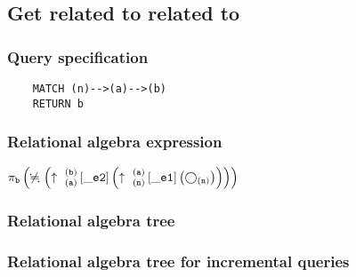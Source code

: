 	\subsection{Get related to related to}

	\subsubsection*{Query specification}

	\begin{lstlisting}
	MATCH (n)-->(a)-->(b)
	RETURN b
	\end{lstlisting}


	\subsubsection*{Relational algebra expression}

	$\projection{\var{b}} \left(\alldifferent{} \left(\expandout{a}{b}{}{\_e2}{} \left(\expandout{n}{a}{}{\_e1}{} \left(\getvertices{n}{}\right)\right)\right)\right)$

	\subsubsection*{Relational algebra tree}


	\subsubsection*{Relational algebra tree for incremental queries}

